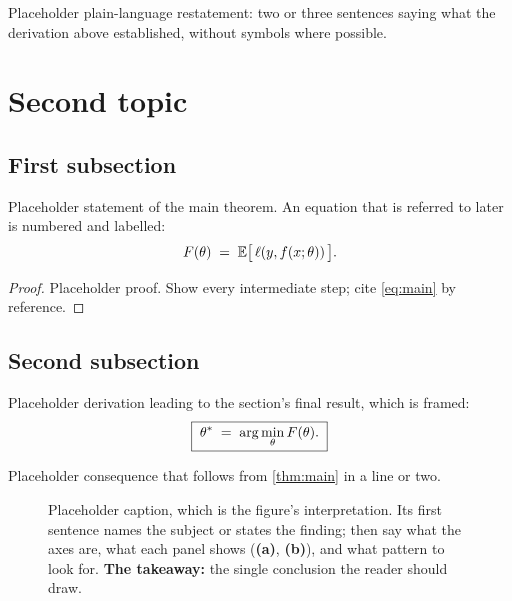 \documentclass{lecturenotes}
\begin{document}
\begin{summary}
Placeholder plain-language restatement: two or three sentences saying what
the derivation above established, without symbols where possible.
\end{summary}

\section{Second topic}\label{sec:second}

\subsection{First subsection}

\begin{theorem}\label{thm:main}
Placeholder statement of the main theorem. An equation that is referred to
later is numbered and labelled:
\begin{equation}\label{eq:main}
  F(\theta) \;=\; \mathbb E\big[\thinspace\ell(y, f(x;\theta))\thinspace\big].
\end{equation}
\end{theorem}

\begin{proof}
Placeholder proof. Show every intermediate step; cite \cref{eq:main} by
reference.
\end{proof}

\subsection{Second subsection}\label{sec:second-sub}

Placeholder derivation leading to the section's final result, which is framed:
\[
  \boxed{\thickspace\theta^\ast \;=\; \arg\min_\theta F(\theta).\thickspace}
\]

\begin{corollary}\label{cor:first}
Placeholder consequence that follows from \cref{thm:main} in a line or two.
\end{corollary}

\begin{figure}
\centering
{}
\caption{Placeholder caption, which is the figure's interpretation. Its first
sentence names the subject or states the finding; then say what the axes
are, what each panel shows (\textbf{(a)}, \textbf{(b)}), and what pattern to
look for. \textbf{The takeaway:} the single conclusion the reader should draw.
}
\label{fig:first}
\end{figure}
\end{document}
